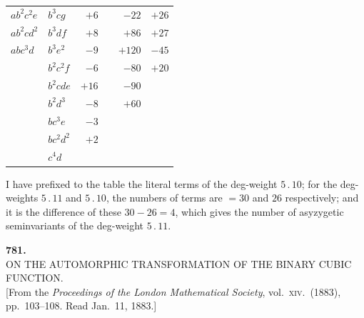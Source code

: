 \documentclass[11pt]{article}
\begin{document}
\begin{center}
\begin{tabular}{|l|l|r|r|r|r|}
$ab^{2}c^{2}e$ & $b^{3}cg$ & $+6$ & & $-22$ & $+26$\\
$ab^{2}cd^{2}$ & $b^{3}df$ & $+8$ & & $+86$ & $+27$\\
$abc^{3}d$ & $b^{3}e^{2}$ & $-9$ & & $+120$ & $-45$\\
& $b^{2}c^{2}f$ & $-6$ & & $-80$ & $+20$\\
& $b^{2}cde$ & $+16$ & & $-90$ & \\
& $b^{2}d^{3}$ & $-8$ & & $+60$ & \\
& $bc^{3}e$ & $-3$ & & & \\
& $bc^{2}d^{2}$ & $+2$ & & & \\
& $c^{4}d$ & & & & \\
\hline
\end{tabular}
\end{center}

\medskip
I have prefixed to the table the literal terms of the deg-weight $5\,.\,10$; for the
deg-weights $5\,.\,11$ and $5\,.\,10$, the numbers of terms are $= 30$ and $26$ respectively;
and it is the difference of these $30 - 26 = 4$, which gives the number of asyzygetic
seminvariants of the deg-weight $5\,.\,11$.


\bigskip

\begin{center}
\textbf{781.}\\[4pt]
\textsc{ON THE AUTOMORPHIC TRANSFORMATION OF THE BINARY CUBIC FUNCTION.}\\[4pt]
[From the \textit{Proceedings of the London Mathematical Society}, vol.\ \textsc{xiv}.\ (1883), pp.\ 103--108. Read Jan.\ 11, 1883.]
\end{center}

\bigskip
\end{document}
